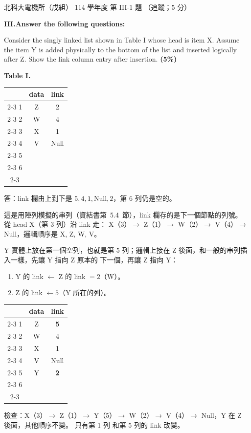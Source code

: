 \begin{pastexam}[label={px:ntut-114-ee-ds-09}]{北科大電機所（戊組） 114 學年度 第 III-1 題}
（追蹤；5 分）

\textbf{III.\quad Answer the following questions:}

Consider the singly linked list shown in Table I whose head is item X. Assume the item Y is added
physically to the bottom of the list and inserted logically after Z. Show the link column entry after
insertion. \textbf{(5\%)}

\begin{center}
\textbf{Table I.}\\[2pt]
\begin{tabular}{c|c|c|}
\multicolumn{1}{c}{} & \multicolumn{1}{c}{data} & \multicolumn{1}{c}{link} \\ \cline{2-3}
1 & Z & 2 \\ \cline{2-3}
2 & W & 4 \\ \cline{2-3}
3 & X & 1 \\ \cline{2-3}
4 & V & Null \\ \cline{2-3}
5 & & \\ \cline{2-3}
6 & & \\ \cline{2-3}
\end{tabular}
\end{center}
\end{pastexam}

\begin{pastsoln}
答：link 欄由上到下是 $5, 4, 1, \text{Null}, 2$，第 6 列仍是空的。

這是用陣列模擬的串列（資結書第~5.4~節），link 欄存的是下一個節點的列號。 從 head X（第 3 列）沿 link 走：
X（3）$\to$ Z（1）$\to$ W（2）$\to$ V（4）$\to$ Null，邏輯順序是 X, Z, W, V。

Y 實體上放在第一個空列，也就是第 5 列；邏輯上接在 Z 後面，和一般的串列插入一樣，先讓 Y 指向 Z 原本的
下一個，再讓 Z 指向 Y：
\begin{enumerate}
\item Y 的 link $\gets$ Z 的 link $= 2$（W）。
\item Z 的 link $\gets 5$（Y 所在的列）。
\end{enumerate}
\begin{center}
\begin{tabular}{c|c|c|}
\multicolumn{1}{c}{} & \multicolumn{1}{c}{data} & \multicolumn{1}{c}{link} \\ \cline{2-3}
1 & Z & \textbf{5} \\ \cline{2-3}
2 & W & 4 \\ \cline{2-3}
3 & X & 1 \\ \cline{2-3}
4 & V & Null \\ \cline{2-3}
5 & Y & \textbf{2} \\ \cline{2-3}
6 & & \\ \cline{2-3}
\end{tabular}
\end{center}
檢查：X（3）$\to$ Z（1）$\to$ Y（5）$\to$ W（2）$\to$ V（4）$\to$ Null，Y 在 Z 後面，其他順序不變。 只有第 1 列
和第 5 列的 link 改變。
\end{pastsoln}
